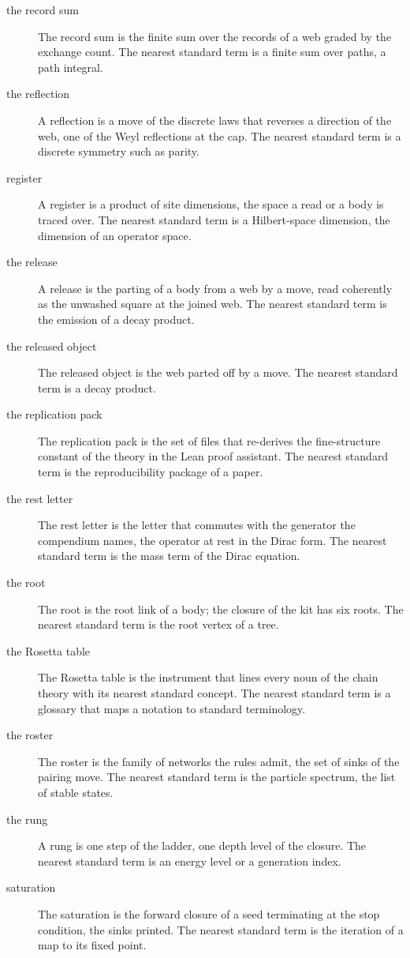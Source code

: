\begin{description}
\item[the record sum] The record sum is the finite sum over the records of a web graded by the exchange count. The nearest standard term is a finite sum over paths, a path integral.
\item[the reflection] A reflection is a move of the discrete laws that reverses a direction of the web, one of the Weyl reflections at the cap. The nearest standard term is a discrete symmetry such as parity.
\item[register] A register is a product of site dimensions, the space a read or a body is traced over. The nearest standard term is a Hilbert-space dimension, the dimension of an operator space.
\item[the release] A release is the parting of a body from a web by a move, read coherently as the unwashed square at the joined web. The nearest standard term is the emission of a decay product.
\item[the released object] The released object is the web parted off by a move. The nearest standard term is a decay product.
\item[the replication pack] The replication pack is the set of files that re-derives the fine-structure constant of the theory in the Lean proof assistant. The nearest standard term is the reproducibility package of a paper.
\item[the rest letter] The rest letter is the letter that commutes with the generator the compendium names, the operator at rest in the Dirac form. The nearest standard term is the mass term of the Dirac equation.
\item[the root] The root is the root link of a body; the closure of the kit has six roots. The nearest standard term is the root vertex of a tree.
\item[the Rosetta table] The Rosetta table is the instrument that lines every noun of the chain theory with its nearest standard concept. The nearest standard term is a glossary that maps a notation to standard terminology.
\item[the roster] The roster is the family of networks the rules admit, the set of sinks of the pairing move. The nearest standard term is the particle spectrum, the list of stable states.
\item[the rung] A rung is one step of the ladder, one depth level of the closure. The nearest standard term is an energy level or a generation index.
\item[saturation] The saturation is the forward closure of a seed terminating at the stop condition, the sinks printed. The nearest standard term is the iteration of a map to its fixed point.

\end{description}
